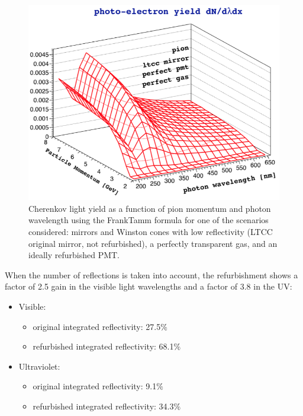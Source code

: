 \begin{figure}
	\centering
	\includegraphics[width=0.98\columnwidth, height=0.75\columnwidth]{img/photonYieldStudy.png}
	\caption{Cherenkov light yield as a function of pion momentum and photon wavelength using the Frank\textendash Tamm formula
             for one of the scenarios considered: mirrors and Winston cones with low reflectivity (LTCC original mirror, not refurbished),
             a perfectly transparent gas, and an ideally refurbished PMT.}
	\label{fig:photonYieldStudy}
\end{figure}

When the number of reflections is taken into account, the refurbishment shows
a factor of 2.5 gain in the visible light wavelengths and a factor of 3.8 in the UV:

\begin{itemize}
	\item Visible:
	\begin{itemize}
		\item original integrated reflectivity: 27.5$\%$
		\item refurbished integrated reflectivity: 68.1$\%$
	\end{itemize}
	\item Ultraviolet:
	\begin{itemize}
		\item original integrated reflectivity: 9.1$\%$
		\item refurbished integrated reflectivity: 34.3$\%$
	\end{itemize}
\end{itemize}

